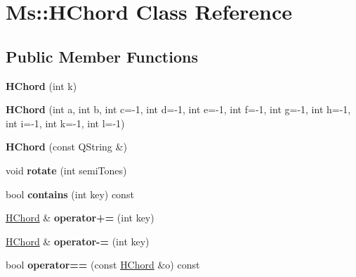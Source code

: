 \hypertarget{class_ms_1_1_h_chord}{}\section{Ms\+:\+:H\+Chord Class Reference}
\label{class_ms_1_1_h_chord}
\subsection*{Public Member Functions}
\begin{DoxyCompactItemize}
\item 
\mbox{\label{class_ms_1_1_h_chord_a01bb4b4a9396fe1d3ddd1feda4d98906}} 
{\bfseries H\+Chord} (int k)
\item 
\mbox{\label{class_ms_1_1_h_chord_a6886f0127eafa102488a9c1bd0e3a19f}} 
{\bfseries H\+Chord} (int a, int b, int c=-\/1, int d=-\/1, int e=-\/1, int f=-\/1, int g=-\/1, int h=-\/1, int i=-\/1, int k=-\/1, int l=-\/1)
\item 
\mbox{\label{class_ms_1_1_h_chord_ab23bbe4306c09523da62121c2b3f2bad}} 
{\bfseries H\+Chord} (const Q\+String \&)
\item 
\mbox{\label{class_ms_1_1_h_chord_a42e49fcef5ca29637f64a30761c28b38}} 
void {\bfseries rotate} (int semi\+Tones)
\item 
\mbox{\label{class_ms_1_1_h_chord_a7cb9b6b155f649b28eed1ba6e248cecd}} 
bool {\bfseries contains} (int key) const
\item 
\mbox{\label{class_ms_1_1_h_chord_a62dffee16867e498b4d37aae27f66657}} 
\hyperlink{class_ms_1_1_h_chord}{H\+Chord} \& {\bfseries operator+=} (int key)
\item 
\mbox{\label{class_ms_1_1_h_chord_a87dd6a9b19c6795ba8ae63a183c3d42e}} 
\hyperlink{class_ms_1_1_h_chord}{H\+Chord} \& {\bfseries operator-\/=} (int key)
\item 
\mbox{\label{class_ms_1_1_h_chord_a3c5418f343bb3ce6a48823f5fc253485}} 
bool {\bfseries operator==} (const \hyperlink{class_ms_1_1_h_chord}{H\+Chord} \&o) const

\end{DoxyCompactItemize}
